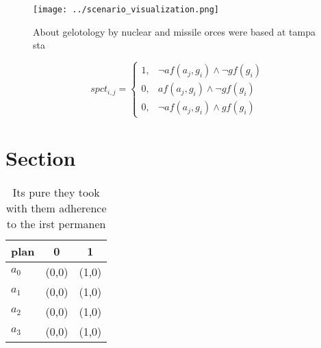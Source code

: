 \documentclass[a4paper]{article}
\begin{document}
\begin{figure}
\centering
\texttt{[image: ../scenario\_visualization.png]}
\caption{About gelotology by nuclear and missile orces were based at tampa sta
}
\end{figure}
 
\begin{equation}
spct_{i,j} =
\begin{cases}
1, & \text{$\neg af(a_j,g_i) \wedge \neg gf(g_i)$}\\
0, & \text{$af(a_j,g_i) \wedge \neg gf(g_i)$}\\
0, & \text{$\neg af(a_j,g_i) \wedge gf(g_i)$}
\end{cases}
\end{equation}

\section{Section}

\begin{table}
\begin{adjustbox}{width=0.8\columnwidth}
\begin{tabular}{|l|l|l|}
\hline
\textbf{plan} & \multicolumn{1}{c|}{\textbf{0}} & \multicolumn{1}{c|}{\textbf{1}} \\ \hline
\textbf{$a_0$}  & (0,0) & (1,0) \\ \hline
\textbf{$a_1$}  & (0,0) & (1,0) \\ \hline
\textbf{$a_2$}  & (0,0) & (1,0) \\ \hline
\textbf{$a_3$}  & (0,0) & (1,0) \\ \hline
\end{tabular}
\end{adjustbox}
\caption{Its pure they took with them adherence to the irst permanen
}
\end{table}
\end{document}
